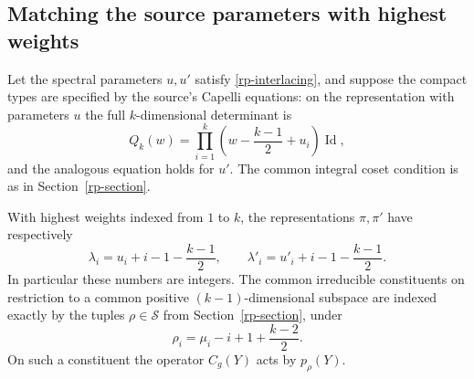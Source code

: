 \subsection{Matching the source parameters with highest weights}

Let the spectral parameters $u,u'$ satisfy
\eqref{rp-interlacing}, and suppose the compact types
are specified by the source's Capelli equations:
on the representation with parameters $u$ the
full $k$-dimensional determinant is
\begin{equation}\label{rd-source-Capelli}
       Q_k(w)=\prod_{i=1}^k
           \left(w-\frac{k-1}{2}+u_i\right)\operatorname{Id},
\end{equation}
and the analogous equation holds for $u'$.
The common integral coset condition is as in
Section~\ref{rp-section}.

\begin{lemma}\label{rd-highest-parameters}
With highest weights indexed from $1$ to $k$, the
representations $\pi,\pi'$ have respectively
\begin{equation}\label{rd-lambda-u}
 \lambda_i=u_i+i-1-\frac{k-1}{2},
 \qquad
 \lambda'_i=u'_i+i-1-\frac{k-1}{2}.
\end{equation}
In particular these numbers are integers.
The common irreducible constituents on restriction
to a common positive $(k-1)$-dimensional subspace
are indexed exactly by the tuples $\rho\in\mathcal S$
from Section~\ref{rp-section}, under
\begin{equation}\label{rd-mu-rho}
                   \rho_i=\mu_i-i+1+\frac{k-2}{2}.
\end{equation}
On such a constituent the operator $C_g(Y)$ acts by
$p_\rho(Y)$.
\end{lemma}


